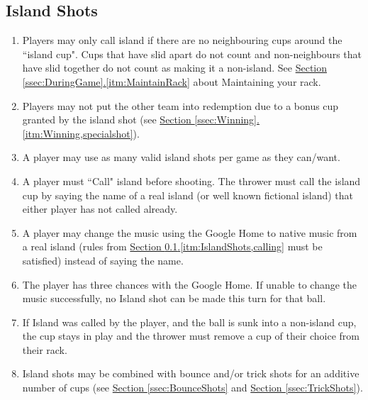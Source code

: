 	\subsection{Island Shots}\label{ssec:IslandShots}
		\begin{enumerate}[label=(\roman*), ref=\roman*]
            \item \label{itm:IslandShots,conditon} Players may only call island if there are no neighbouring cups around the ``island cup".
                Cups that have slid apart do not count and non-neighbours that have slid together do not count as making it a non-island.
                See \hyperref[itm:MaintainRack]{Section \ref*{ssec:DuringGame}.\ref*{itm:MaintainRack}} about Maintaining your rack.
            \item \label{itm:IslandShots,winning} Players may not put the other team into redemption due to a bonus cup granted by the island shot
                (see \hyperref[itm:Winning,specialshot]{Section \ref*{ssec:Winning}.\ref*{itm:Winning,specialshot}}).
            \item \label{itm:IslandShots,times} A player may use as many valid island shots per game as they can/want.
            \item \label{itm:IslandShots,calling} A player must ``Call" island before shooting.
                The thrower must call the island cup by saying the name of a real island (or well known fictional island) that either player has not called already.
            \item \label{itm:IslandShots,musicCalling} A player may change the music using the Google Home to native music from a real island (rules from \hyperref[itm:IslandShots,calling]{Section \ref*{ssec:IslandShots}.\ref*{itm:IslandShots,calling}} must be satisfied) instead of saying the name.
            \item \label{itm:IslandShots,musicAttempts} The player has three chances with the Google Home. If unable to change the music successfully, no Island shot can be made this turn for that ball.
            \item \label{itm:IslandShots,missincup} If Island was called by the player, and the ball is sunk into a non-island cup, the cup stays in play and the thrower must remove a cup of their choice from their rack.	
            \item \label{itm:IslandShots,combo} Island shots may be combined with bounce and/or trick shots for an additive number of cups
                (see \hyperref[ssec:BounceShots]{Section \ref*{ssec:BounceShots}} and \hyperref[ssec:TrickShots]{Section \ref*{ssec:TrickShots}}).

\end{enumerate}
